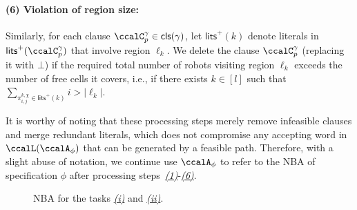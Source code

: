 \documentclass[Afour,sageh,times]{sagej}
\newcommand{\clause}[1]{\mathsf{cls}(#1)}
\newcommand{\cp}[2]{\ccalC_{#1}^{#2}}
\newcommand{\autop}{\ccalA_{\phi}}
\renewcommand{\ap}[3]{\mathcal{\pi}_{{#1},{#2}}^{#3}}
\begin{document}
       \paragraph{(6) Violation of region size:} \label{prune:violation2} Similarly, for each clause $\cp{p}{\gamma} \in \clause{\gamma}$, let $\mathsf{lits}^+(k)$ denote literals in $\mathsf{lits}^+(\cp{p}{\gamma})$ that involve region $\ell_{k}$. We delete the clause $\cp{p}{\gamma}$ (replacing it with $\bot$) if the required total number of robots  visiting region $\ell_{k}$ exceeds the number of free cells it covers, i.e., if there exists $k\in[l]$ such that $ \sum_{\ap{i}{j}{k,\chi}\in\mathsf{lits}^+(k)}   i > |\ell_k|$.

       It is worthy of noting that these processing steps  merely  remove infeasible clauses and merge redundant literals, which does not compromise any accepting word in $\ccalL(\autop)$ that can be generated by a feasible path. Therefore, with a slight abuse of notation, we continue use $\autop$ to refer to the NBA of specification $\phi$ after processing steps~\hyperref[prune:exclusion1]{\it (1)}-\hyperref[prune:violation2]{\it (6)}.


 \begin{figure}[!t]
   \centering
   \caption{NBA for the tasks \hyperref[task:i]{\it (i)} and \hyperref[task:ii]{\it (ii)}.}
   \label{fig:nba_iii}
 \end{figure}
\end{document}
